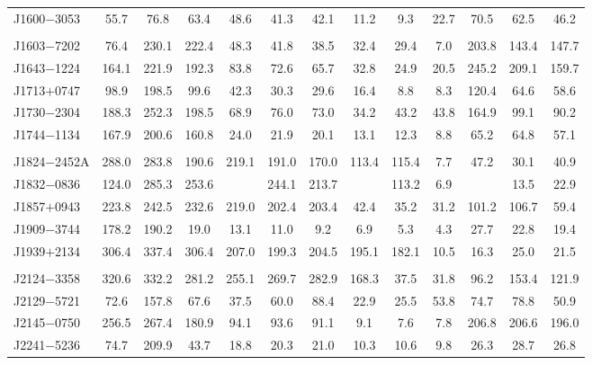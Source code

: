 \documentclass[useAMS,usenatbib]{mn2e}
\begin{document}
\begin{table}
\begin{center}
\begin{tabular}{lcccccccccccc}
J1600$-$3053     & 55.7  &  76.8  &  63.4   &  48.6      & 41.3   & 42.1   & 11.2  & 9.3   & 22.7    &  70.5   &  62.5  & 46.2       \\
	               &       &        &         &       &   &   &   &   &              \\
J1603$-$7202     & 76.4  &  230.1 &  222.4  &  48.3      & 41.8   & 38.5   & 32.4  & 29.4  & 7.0     &  203.8&  143.4  & 147.7  \\
J1643$-$1224     & 164.1 &  221.9 &  192.3  &  83.8      & 72.6   & 65.7   & 32.8  & 24.9  & 20.5    &  245.2&  209.1  & 159.7   \\
J1713$+$0747     & 98.9  &  198.5 &  99.6   &  42.3      & 30.3   & 29.6   & 16.4  & 8.8   & 8.3     &  120.4&  64.6   & 58.6   \\
J1730$-$2304     & 188.3 &  252.3 &  198.5  &  68.9      & 76.0   & 73.0   & 34.2  & 43.2  & 43.8    &  164.9&  99.1   & 90.2    \\
J1744$-$1134     & 167.9 &  200.6 &  160.8  &  24.0      & 21.9   & 20.1   & 13.1  & 12.3  & 8.8     &  65.2 &  64.8   & 57.1   \\
	               &       &        &         &       &   &   &   &   &              \\
J1824$-$2452A    & 288.0 &  283.8 &  190.6  &  219.1     & 191.0  & 170.0  & 113.4 &115.4   &7.7     &  47.2 &  30.1   & 40.9   \\
J1832$-$0836     & 124.0 &  285.3 &  253.6  &            & 244.1  & 213.7  &       & 113.2  &  6.9   &       &  13.5   & 22.9 \\
J1857$+$0943     & 223.8 &  242.5 &  232.6  &  219.0     & 202.4  & 203.4  & 42.4  & 35.2  & 31.2    &  101.2&  106.7  & 59.4  \\
J1909$-$3744     & 178.2 &  190.2 &  19.0   &  13.1      & 11.0   & 9.2    & 6.9  &  5.3   & 4.3     &  27.7 &  22.8   & 19.4 \\
J1939$+$2134     & 306.4 &  337.4 &  306.4  &  207.0     & 199.3  & 204.5  & 195.1  &182.1   & 10.5  &  16.3 &  25.0   & 21.5     \\
	               &       &        &         &       &   &   &   &   &              \\
J2124$-$3358     & 320.6 &  332.2 &  281.2  &  255.1     & 269.7  & 282.9  & 168.3 & 37.5  & 31.8    &  96.2 &  153.4  & 121.9   \\
J2129$-$5721     & 72.6  &  157.8 &  67.6   &  37.5      & 60.0   & 88.4   & 22.9  & 25.5  & 53.8    &  74.7 &  78.8   & 50.9    \\
J2145$-$0750     & 256.5 &  267.4 &  180.9  &  94.1      & 93.6   & 91.1   & 9.1   & 7.6   & 7.8     &  206.8&  206.6  & 196.0  \\
J2241$-$5236     & 74.7  &  209.9 &  43.7   &  18.8      & 20.3   & 21.0   & 10.3  & 10.6  & 9.8     &  26.3 &  28.7   & 26.8   \\
\hline
\end{tabular}
\end{center}
\end{table}
\end{document}
